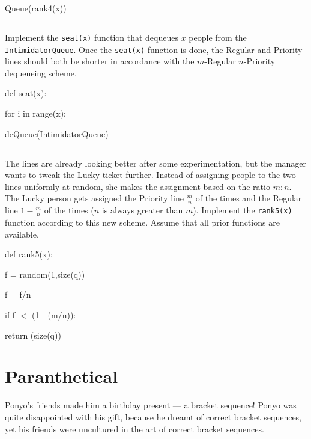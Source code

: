 \documentclass[addpoints]{exam}
\begin{document}
	\begin{mdframed}
		Queue(rank4(x))
	\end{mdframed}
	
	\subsection{} Implement the \texttt{seat(x)} function that dequeues $x$ people from the \texttt{IntimidatorQueue}. Once the \texttt{seat(x)} function is done, the Regular and Priority lines should both be shorter in accordance with the $m$-Regular $n$-Priority dequeueing scheme.
	
	\begin{mdframed}
		def seat(x):
		
    for i in range(x):
    
    \hspace*{20pt}deQueue(IntimidatorQueue)
	\end{mdframed}
	
	\subsection{} The lines are already looking better after some experimentation, but the manager wants to tweak the Lucky ticket further. Instead of assigning people to the two lines uniformly at random, she makes the assignment based on the ratio $m:n$. The Lucky person gets assigned the Priority line $\frac{m}{n}$ of the times and the Regular line $1 - \frac{m}{n}$ of the times ($n$ is always greater than $m$). Implement the \texttt{rank5(x)} function according to this new scheme. Assume that all prior functions are available.
	
	\begin{mdframed}
		def rank5(x):
    
    f = random(1,size(q))
    
    f = f/n
    
    if f $<$ (1 - (m/n)):
    
    \hspace*{20pt}return (size(q))
	\end{mdframed}
	
	\section{Paranthetical}
	Ponyo's friends made him a birthday present — a bracket sequence! Ponyo was quite disappointed with his gift, because he dreamt of correct bracket sequences, yet his friends were uncultured in the art of correct bracket sequences.
	
\end{document}
